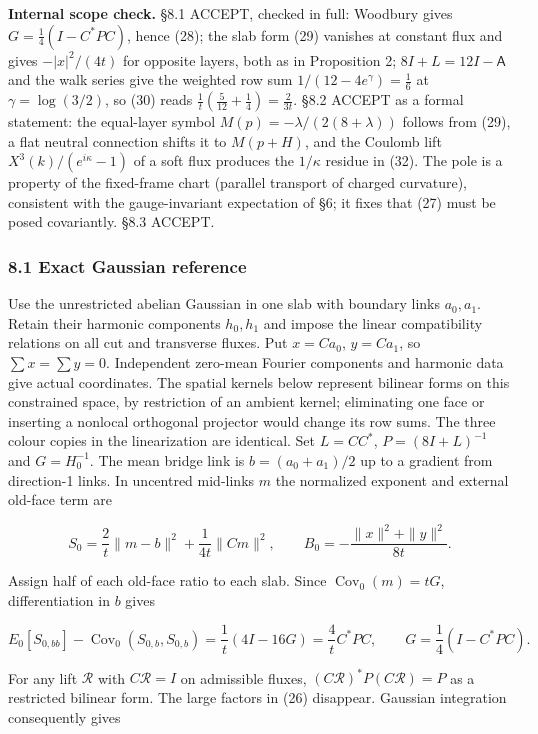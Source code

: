\documentclass[11pt,a4paper]{article}
\begin{document}
\textbf{Internal scope check.} §8.1 ACCEPT, checked in full: Woodbury
gives \(G=\frac14(I-C^*PC)\), hence (28); the slab form (29) vanishes at
constant flux and gives \(-|x|^2/(4t)\) for opposite layers, both as in
Proposition 2; \(8I+L=12I-\mathsf A\) and the walk series give the
weighted row sum \(1/(12-4e^\gamma)=\frac16\) at \(\gamma=\log(3/2)\),
so (30) reads \(\frac1t(\frac5{12}+\frac14)=\frac2{3t}\). §8.2 ACCEPT as
a formal statement: the equal-layer symbol
\(M(p)=-\lambda/(2(8+\lambda))\) follows from (29), a flat neutral
connection shifts it to \(M(p+H)\), and the Coulomb lift
\(X^3(k)/(e^{i\kappa}-1)\) of a soft flux produces the \(1/\kappa\)
residue in (32). The pole is a property of the fixed-frame chart
(parallel transport of charged curvature), consistent with the
gauge-invariant expectation of §6; it fixes that (27) must be posed
covariantly. §8.3 ACCEPT.

\hypertarget{exact-gaussian-reference}{%
\subsubsection{8.1 Exact Gaussian
reference}\label{exact-gaussian-reference}}

Use the unrestricted abelian Gaussian in one slab with boundary links
\(a_0,a_1\). Retain their harmonic components \(h_0,h_1\) and impose the
linear compatibility relations on all cut and transverse fluxes. Put
\(x=Ca_0\), \(y=Ca_1\), so \(\sum x=\sum y=0\). Independent zero-mean
Fourier components and harmonic data give actual coordinates. The
spatial kernels below represent bilinear forms on this constrained
space, by restriction of an ambient kernel; eliminating one face or
inserting a nonlocal orthogonal projector would change its row sums. The
three colour copies in the linearization are identical. Set \(L=CC^*\),
\(P=(8I+L)^{-1}\) and \(G=H_0^{-1}\). The mean bridge link is
\(b=(a_0+a_1)/2\) up to a gradient from direction-1 links. In uncentred
mid-links \(m\) the normalized exponent and external old-face term are

\[S_0=\frac{2}{t}\|m-b\|^2+\frac1{4t}\|Cm\|^2,
\qquad B_0=-\frac{\|x\|^2+\|y\|^2}{8t}.\]

Assign half of each old-face ratio to each slab. Since
\(\operatorname{Cov}_0(m)=tG\), differentiation in \(b\) gives

\[E_0[S_{0,bb}]-\operatorname{Cov}_0(S_{0,b},S_{0,b})
=\frac1t(4I-16G)=\frac4t C^*PC,
\qquad G=\frac14(I-C^*PC).\tag{28}\]

For any lift \(\mathcal R\) with \(C\mathcal R=I\) on admissible fluxes,
\((C\mathcal R)^*P(C\mathcal R)=P\) as a restricted bilinear form. The
large factors in (26) disappear. Gaussian integration consequently gives
\end{document}

